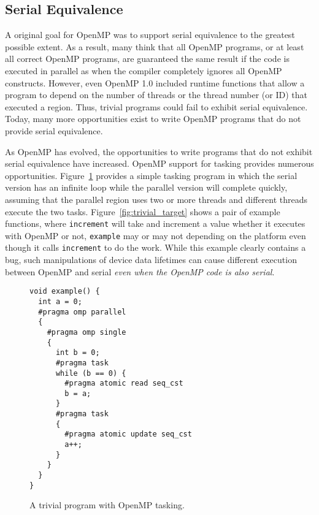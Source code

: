 \subsection{Serial Equivalence}
\label{sub:serial_equivalence}

A original goal for OpenMP was to support serial equivalence to the 
greatest possible extent. As a result, many think that all OpenMP programs, 
or at least all correct OpenMP programs, are guaranteed the same result
if the code is executed in parallel as when the compiler completely 
ignores all OpenMP constructs. However, even OpenMP 1.0 included runtime
functions that allow a program to depend on the number of threads or the
thread number (or ID) that executed a region. Thus, trivial programs could
fail to exhibit serial equivalence. Today, many more opportunities exist
to write OpenMP programs that do not provide serial equivalence. 


As OpenMP has evolved, the opportunities to write programs that do not
exhibit serial equivalence have increased. OpenMP support for tasking 
provides numerous opportunities. Figure~\ref{fig:trivial_task} provides
a simple tasking program in which the serial version has an infinite loop
while the parallel version will complete quickly, assuming that the parallel
region uses two or more threads and different threads execute the two tasks.
Figure~\ref{fig:trivial_target} shows a pair of example functions, where
\texttt{increment} will take and increment a value whether it executes with
OpenMP or not, \texttt{example} may or may not depending on the platform even
though it calls \texttt{increment} to do the work.  While this example clearly
contains a bug, such manipulations of device data lifetimes can cause different
execution between OpenMP and serial \emph{even when the OpenMP code is also
serial}.

\begin{figure}
\begin{verbatim}
void example() {
  int a = 0;
  #pragma omp parallel
  {
    #pragma omp single
    {
      int b = 0;
      #pragma task
      while (b == 0) {
        #pragma atomic read seq_cst
        b = a;
      }
      #pragma task
      {
        #pragma atomic update seq_cst
        a++;
      }
    }
  }
}
\end{verbatim}
\caption{A trivial program with OpenMP tasking.\label{fig:trivial_task}}
\end{figure}


